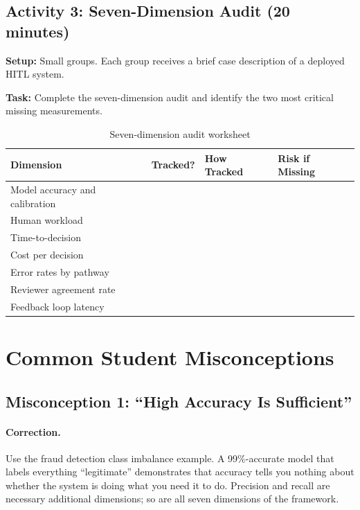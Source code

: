 \subsection{Activity 3: Seven-Dimension Audit (20 minutes)}

\textbf{Setup:} Small groups. Each group receives a brief case description of a deployed HITL system.

\textbf{Task:} Complete the seven-dimension audit and identify the two most critical missing measurements.

\begin{table}[htbp]
\caption{Seven-dimension audit worksheet}
\label{tab:seven-dim-worksheet}
\centering
\begin{tabular}{@{}p{3.5cm}p{2cm}p{4.5cm}p{2.5cm}@{}}
\toprule
\textbf{Dimension} & \textbf{Tracked?} & \textbf{How Tracked} & \textbf{Risk if Missing} \\
\midrule
Model accuracy and calibration & & & \\[6pt]
Human workload & & & \\[6pt]
Time-to-decision & & & \\[6pt]
Cost per decision & & & \\[6pt]
Error rates by pathway & & & \\[6pt]
Reviewer agreement rate & & & \\[6pt]
Feedback loop latency & & & \\
\bottomrule
\end{tabular}
\end{table}

\section{Common Student Misconceptions}

\subsection{Misconception 1: ``High Accuracy Is Sufficient''}

\paragraph{Correction.}
Use the fraud detection class imbalance example. A 99\%-accurate model that labels everything ``legitimate'' demonstrates that accuracy tells you nothing about whether the system is doing what you need it to do. Precision and recall are necessary additional dimensions; so are all seven dimensions of the framework.

